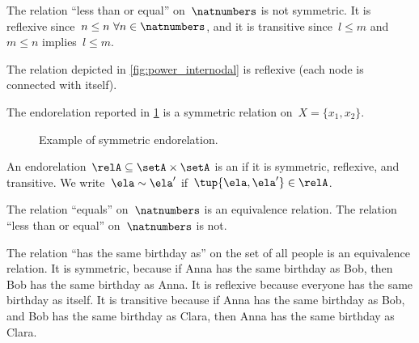\begin{example}
  The relation ``less than or equal'' on~$\natnumbers$ is not symmetric. It is reflexive since~$n\leq n \ \forall n\in \natnumbers$, and it is transitive since~$l\leq m$ and~$m\leq n$ implies~$l\leq m$.
\end{example}

\begin{example}
  The relation depicted in \cref{fig:power_internodal} is reflexive (each node is connected with itself).
\end{example}

\begin{example}
  The endorelation reported in \cref{fig:ex_sym_rel} is a symmetric relation on~$X=\{x_1,x_2\}$.
  \begin{figure}[h!]
    \begin{center}
    \end{center}
    \caption{Example of symmetric endorelation.}
    \label{fig:ex_sym_rel}
  \end{figure}
\end{example}



\begin{definition}
  \label{def:equivalence-relation}
  An endorelation~$\relA\subseteq \setA\times \setA$ is an \emph{} if it is symmetric, reflexive, and transitive. We write~$\ela\sim \ela'$ if~$\tup{\ela,\ela'}\in \relA$.
\end{definition}

\begin{example}
  The relation ``equals'' on~$\natnumbers$ is an equivalence relation.
  The relation ``less than or equal'' on~$\natnumbers$ is not.
\end{example}

\begin{example}
  The relation ``has the same birthday as'' on the set of all people is an equivalence relation.
  It is symmetric, because if Anna has the same birthday as Bob, then Bob has the same birthday as Anna.
  It is reflexive because everyone has the same birthday as itself.
  It is transitive because if Anna has the same birthday as Bob, and Bob has the same birthday as Clara, then Anna has the same birthday as Clara.
\end{example}

